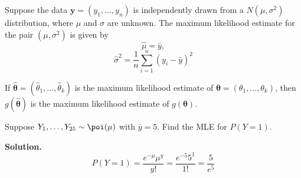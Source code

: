 \begin{Proposition}{}{}
    Suppose the data $ \symbf{y}=(y_1,\ldots ,y_n) $ is independently
    drawn from a $ N(\mu,\sigma^2) $ distribution,
    where $ \mu $ and $ \sigma $ are unknown. The maximum
    likelihood estimate for the pair $ (\mu,\sigma^2) $ is given by
    \[ \hat{\mu}=\bar{y}, \]
    \[ \hat{\sigma}^2=\frac{1}{n} \sum\limits_{i=1}^{n} \left( y_i-\bar{y} \right)^2 \]
\end{Proposition}



\begin{Theorem}{}{}
    If $ \hat{\symbf{\theta}}=(\hat{\theta}_1,\ldots ,\hat{\theta}_k) $ is the maximum likelihood
    estimate of $ \symbf{\theta}=(\theta_1,\ldots ,\theta_k) $, then
    $ g(\symbf{\hat{\theta}}) $ is the maximum likelihood estimate of $ g(\symbf{\theta}) $.
\end{Theorem}



\begin{Example}{}{}
    Suppose $ Y_1,\ldots ,Y_{25} \sim \poi(\mu) $ with $ \bar{y}=5 $.
    Find the MLE for $ P(Y=1) $.

    \textbf{Solution.}
    \[ P(Y=1)=\frac{e^{-\mu}\mu^y}{y!}=\frac{e^{-5}5^1}{1!}=\frac{5}{e^5} \]
\end{Example}

